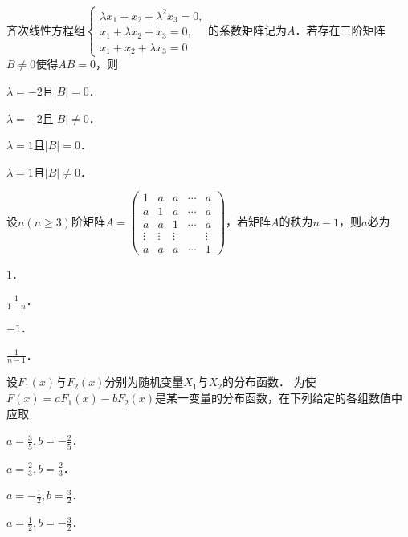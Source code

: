 \documentclass[plain,noanswer,medmath]{../../template/jnuexam}
\begin{document}
\begin{problem}
齐次线性方程组$\begin{cases}
  \lambda x_1 + x_2 + \lambda^2x_3 = 0, \\
  x_1 + \lambda x_2 + x_3 = 0, \\
  x_1 + x_2 + \lambda x_3 = 0
\end{cases}$的系数矩阵记为$A$．若存在三阶矩阵$B \ne 0$使得$AB = 0$，则\pickout{}
\begin{abcd}
\item $\lambda = - 2$且$|B| = 0$．
\item $\lambda = - 2$且$|B| \ne 0$．
\item $\lambda = 1$且$|B| = 0$．
\item $\lambda = 1$且$|B| \ne 0$．
\end{abcd}
\end{problem}


\begin{problem}
设$n\left(n \ge 3 \right)$阶矩阵$A = \begin{pmatrix}
       1 &      a &      a & \cdots & a \\
       a &      1 &      a & \cdots & a \\
       a &      a &      1 & \cdots & a \\
  \vdots & \vdots & \vdots &        & \vdots \\
       a &      a &      a & \cdots & 1
\end{pmatrix}$，若矩阵$A$的秩为$n - 1$，则$a$必为\pickout{}
\begin{abcd}
\item $1$．
\item $\frac{1}{1 - n}$．
\item $- 1$．
\item $\frac{1}{n - 1}$．
\end{abcd}
\end{problem}


\begin{problem}
设$F_1(x)$与$F_2(x)$分别为随机变量$X_1$与$X_2$的分布函数．
为使$F(x) = aF_1(x) - bF_2(x)$是某一变量的分布函数，在下列给定的各组数值中应取\pickout{}
\begin{abcd}
\item $a = \frac{3}{5},b = - \frac{2}{5}$．
\item $a = \frac{2}{3},b = \frac{2}{3}$．
\item $a = - \frac{1}{2},b = \frac{3}{2}$．
\item $a = \frac{1}{2},b = - \frac{3}{2}$．
\end{abcd}
\end{problem}
\end{document}
